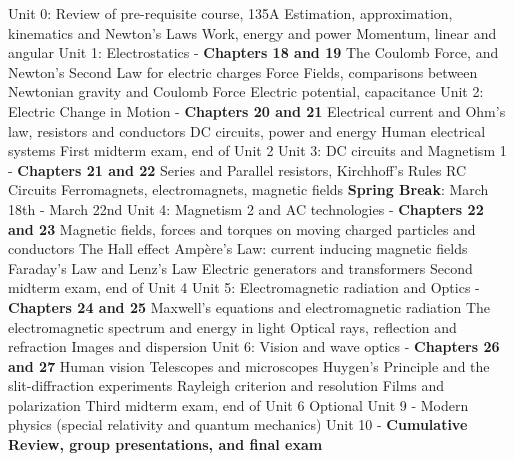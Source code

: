 \documentclass[10pt]{article}
\begin{document}
\begin{outline}[enumerate]
\1 Unit 0: Review of pre-requisite course, 135A
\2 Estimation, approximation, kinematics and Newton's Laws
\2 Work, energy and power
\2 Momentum, linear and angular
\1 Unit 1: Electrostatics - \textbf{Chapters 18 and 19}
\2 The Coulomb Force, and Newton's Second Law for electric charges
\2 Force Fields, comparisons between Newtonian gravity and Coulomb Force
\2 Electric potential, capacitance
\1 Unit 2: Electric Change in Motion - \textbf{Chapters 20 and 21}
\2 Electrical current and Ohm's law, resistors and conductors
\2 DC circuits, power and energy
\2 Human electrical systems
\1 First midterm exam, end of Unit 2
\1 Unit 3: DC circuits and Magnetism 1 - \textbf{Chapters 21 and 22}
\2 Series and Parallel resistors, Kirchhoff's Rules
\2 RC Circuits
\2 Ferromagnets, electromagnets, magnetic fields
\1 \textbf{Spring Break}: March 18th - March 22nd
\1 Unit 4: Magnetism 2 and AC technologies - \textbf{Chapters 22 and 23}
\2 Magnetic fields, forces and torques on moving charged particles and conductors
\2 The Hall effect
\2 Amp\`{e}re's Law: current inducing magnetic fields
\2 Faraday's Law and Lenz's Law
\2 Electric generators and transformers
\1 Second midterm exam, end of Unit 4
\1 Unit 5: Electromagnetic radiation and Optics - \textbf{Chapters 24 and 25}
\2 Maxwell's equations and electromagnetic radiation
\2 The electromagnetic spectrum and energy in light
\2 Optical rays, reflection and refraction
\2 Images and dispersion
\1 Unit 6: Vision and wave optics - \textbf{Chapters 26 and 27}
\2 Human vision
\2 Telescopes and microscopes
\2 Huygen's Principle and the slit-diffraction experiments
\2 Rayleigh criterion and resolution
\2 Films and polarization
\1 Third midterm exam, end of Unit 6
\1 Optional Unit 9 - Modern physics (special relativity and quantum mechanics)
\1 Unit 10 - \textbf{Cumulative Review, group presentations, and final exam}
\end{outline}
\end{document}
